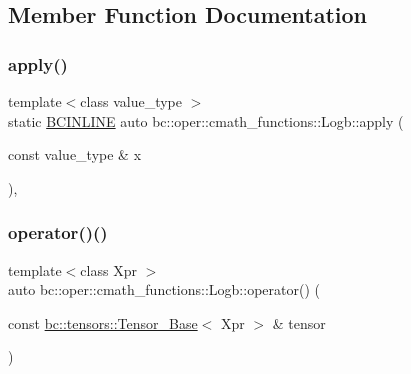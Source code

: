 \subsection{Member Function Documentation}
\mbox{\label{structbc_1_1oper_1_1cmath__functions_1_1Logb_afc919b9959a9e4eb8d154d369a86fc50}} 
\subsubsection{\texorpdfstring{apply()}{apply()}}
{\footnotesize\ttfamily template$<$class value\+\_\+type $>$ \\
static \hyperlink{common_8h_a6699e8b0449da5c0fafb878e59c1d4b1}{B\+C\+I\+N\+L\+I\+NE} auto bc\+::oper\+::cmath\+\_\+functions\+::\+Logb\+::apply (\begin{DoxyParamCaption}\item[{const value\+\_\+type \&}]{x }\end{DoxyParamCaption})\hspace{0.3cm}{\ttfamily [inline]}, {\ttfamily [static]}}

\mbox{\label{structbc_1_1oper_1_1cmath__functions_1_1Logb_a1649ef9d7fae8c1151c011cc7b836973}} 
\subsubsection{\texorpdfstring{operator()()}{operator()()}\hspace{0.1cm}{\footnotesize\ttfamily [1/3]}}
{\footnotesize\ttfamily template$<$class Xpr $>$ \\
auto bc\+::oper\+::cmath\+\_\+functions\+::\+Logb\+::operator() (\begin{DoxyParamCaption}\item[{const \hyperlink{classbc_1_1tensors_1_1Tensor__Base}{bc\+::tensors\+::\+Tensor\+\_\+\+Base}$<$ Xpr $>$ \&}]{tensor }\end{DoxyParamCaption})\hspace{0.3cm}{\ttfamily [inline]}}


